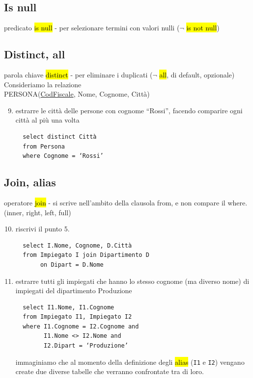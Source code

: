 \documentclass[a4paper]{article}
\begin{document}
\subsection{Is null}
predicato \hl{is null} - per selezionare termini con valori nulli ($\neg$ \hl{is not null})

\subsection{Distinct, all}
parola chiave \hl{distinct} - per eliminare i duplicati ($\neg$ \hl{all}, di default, opzionale)\medskip\medskip\medskip\\
%
Consideriamo la relazione\\
PERSONA(\underline{CodFiscale}, Nome, Cognome, Città)
%
\begin{enumerate}[leftmargin=*]
  \setcounter{enumi}{8}
  \item estrarre le città delle persone con cognome “Rossi”, facendo comparire ogni città al più una volta
  \begin{verbatim}
  select distinct Città
  from Persona
  where Cognome = ‘Rossi’
  \end{verbatim}
\end{enumerate}

\subsection{Join, alias}
operatore \hl{join} - si scrive nell’ambito della clausola from, e non compare il where. (inner, right, left, full)
\begin{enumerate}[leftmargin=*]
  \setcounter{enumi}{9}
  \item riscrivi il punto 5.
  \begin{verbatim}
  select I.Nome, Cognome, D.Città
  from Impiegato I join Dipartimento D
       on Dipart = D.Nome
  \end{verbatim}

  \item estrarre tutti gli impiegati che hanno lo stesso cognome (ma diverso nome) di impiegati del dipartimento Produzione
  \begin{verbatim}
  select I1.Nome, I1.Cognome
  from Impiegato I1, Impiegato I2
  where I1.Cognome = I2.Cognome and
        I1.Nome <> I2.Nome and
        I2.Dipart = ‘Produzione’
  \end{verbatim}
  immaginiamo che al momento della definizione degli \hl{alias} (\texttt{I1} e \texttt{I2}) vengano create due diverse tabelle che verranno confrontate tra di loro.
\end{enumerate}
\end{document}
